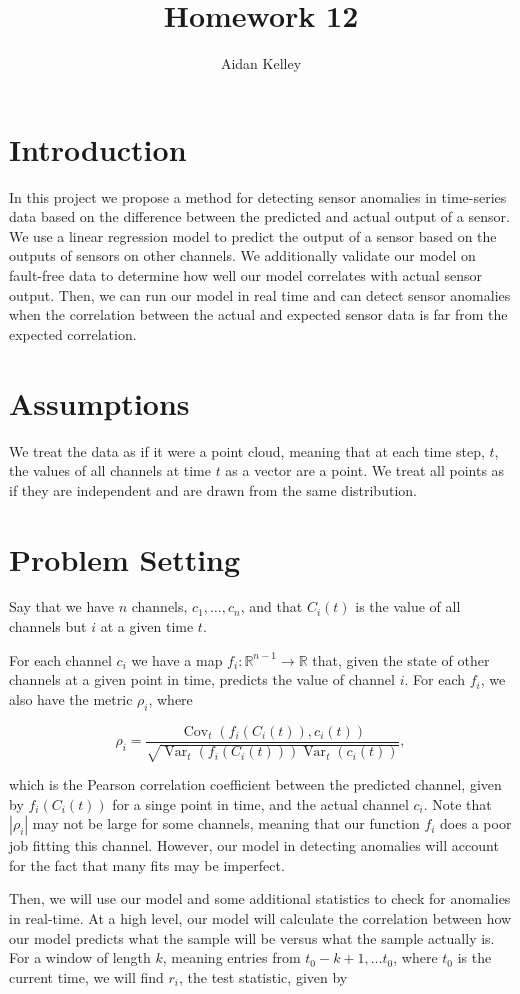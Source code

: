 \documentclass{article}
\title{Homework 12}
\author{Aidan Kelley}
\newcommand{\bR}{\mathbb{R}}
\DeclareMathOperator{\Cov}{\mathrm{Cov}}
\DeclareMathOperator{\Var}{\mathrm{Var}}
\begin{document}
\section{Introduction}

In this project we propose a method for detecting sensor anomalies in time-series data based on the difference between the predicted and actual output of a sensor. We use a linear regression model to predict the output of a sensor based on the outputs of sensors on other channels. We additionally validate our model on fault-free data to determine how well our model correlates with actual sensor output. Then, we can run our model in real time and can detect sensor anomalies when the correlation between the actual and expected sensor data is far from the expected correlation.

\section{Assumptions}

We treat the data as if it were a point cloud, meaning that at each time step, $t$, the values of all channels at time $t$ as a vector are a point. We treat all points as if they are independent and are drawn from the same distribution.

\section{Problem Setting}

Say that we have $n$ channels, $c_1, \ldots, c_n$, and that $C_i(t)$ is the value of all channels but $i$ at a given time $t$.

For each channel $c_i$ we have a map $f_i: \bR^{n - 1} \to \bR$ that, given the state of other channels at a given point in time, predicts the value of channel $i$. For each $f_i$, we also have the metric $\rho_i$, where

$$\rho_i = \frac{\Cov_t(f_i(C_i(t)), c_i(t))}{\sqrt{\Var_t(f_i(C_i(t)))\Var_t(c_i(t))}},$$

which is the Pearson correlation coefficient between the predicted channel, given by $f_i(C_i(t))$ for a singe point in time, and the actual channel $c_i$. Note that $|\rho_i|$ may not be large for some channels, meaning that our function $f_i$ does a poor job fitting this channel. However, our model in detecting anomalies will account for the fact that many fits may be imperfect.

Then, we will use our model and some additional statistics to check for anomalies in real-time. At a high level, our model will calculate the correlation between how our model predicts what the sample will be versus what the sample actually is. For a window of length $k$, meaning entries from $t_0-k+1, \ldots t_0$, where $t_0$ is the current time, we will find $r_i$, the test statistic, given by
\end{document}
